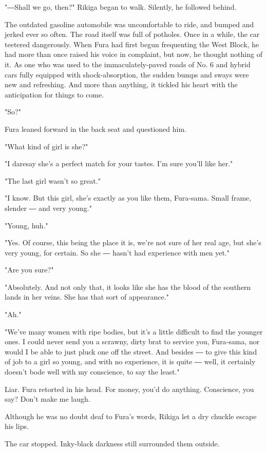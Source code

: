 "―Shall we go, then?" Rikiga began to walk. Silently, he followed
behind.

The outdated gasoline automobile was uncomfortable to ride, and bumped
and jerked ever so often. The road itself was full of potholes. Once in
a while, the car teetered dangerously. When Fura had first begun
frequenting the West Block, he had more than once raised his voice in
complaint, but now, he thought nothing of it. As one who was used to the
immaculately-paved roads of No. 6 and hybrid cars fully equipped with
shock-absorption, the sudden bumps and sways were new and refreshing.
And more than anything, it tickled his heart with the anticipation for
things to come.

"So?"

Fura leaned forward in the back seat and questioned him.

"What kind of girl is she?"

"I daresay she's a perfect match for your tastes. I'm sure you'll like
her."

"The last girl wasn't so great."

"I know. But this girl, she's exactly as you like them, Fura-sama. Small
frame, slender ― and very young."

"Young, huh."

"Yes. Of course, this being the place it is, we're not sure of her real
age, but she's very young, for certain. So she ― hasn't had experience
with men yet."

"Are you sure?"

"Absolutely. And not only that, it looks like she has the blood of the
southern lands in her veins. She has that sort of appearance."

"Ah."

"We've many women with ripe bodies, but it's a little difficult to find
the younger ones. I could never send you a scrawny, dirty brat to
service you, Fura-sama, nor would I be able to just pluck one off the
street. And besides ― to give this kind of job to a girl so young, and
with no experience, it is quite ― well, it certainly doesn't bode well
with my conscience, to say the least."

Liar. Fura retorted in his head. For money, you'd do anything.
Conscience, you say? Don't make me laugh.

Although he was no doubt deaf to Fura's words, Rikiga let a dry chuckle
escape his lips.

The car stopped. Inky-black darkness still surrounded them outside.

